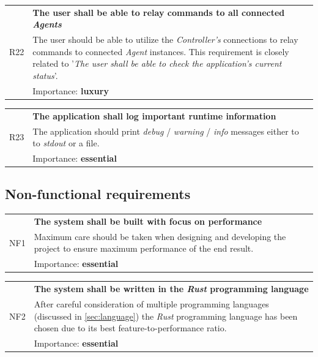 \documentclass[12pt,a4paper,table]{article}
\begin{document}
                \vspace{0.5cm}
                \noindent
                \begin{tabular}{ p{0.7cm}|p{14.5cm} }
                    \multirow{3}{*}{R22} & \textbf{The user shall be able to relay commands to all connected \textit{Agents}}\\
                    \cline{2-2}
                    & The user should be able to utilize the \textit{Controller's} connections to relay commands to connected \textit{Agent} instances. This requirement is closely related to '\textit{The user shall be able to check the application's current status}'.\\
                    \cline{2-2}
                    & Importance: \textbf{luxury}
                \end{tabular}

                \vspace{0.5cm}
                \noindent
                \begin{tabular}{ p{0.7cm}|p{14.5cm} }
                    \multirow{3}{*}{R23} & \textbf{The application shall log important runtime information}\\
                    \cline{2-2}
                    & The application should print \textit{debug} / \textit{warning} / \textit{info} messages either to to \textit{stdout} or a file.\\
                    \cline{2-2}
                    & Importance: \textbf{essential}
                \end{tabular}



        \subsection{Non-functional requirements}
            \begin{tabular}{ p{0.7cm}|p{14.5cm} }
                \multirow{3}{*}{NF1} & \textbf{The system shall be built with focus on performance}\\
                \cline{2-2}
                & Maximum care should be taken when designing and developing the project to ensure maximum performance of the end result.\\
                \cline{2-2}
                & Importance: \textbf{essential}
            \end{tabular}

            \vspace{0.5cm}
            \noindent
            \begin{tabular}{ p{0.7cm}|p{14.5cm} }
                \multirow{3}{*}{NF2} & \textbf{The system shall be written in the \textit{Rust} programming language}\\
                \cline{2-2}
                & After careful consideration of multiple programming languages (discussed in \autoref{sec:language}) the \textit{Rust} programming language has been chosen due to its best feature-to-performance ratio.\\
                \cline{2-2}
                & Importance: \textbf{essential}
            \end{tabular}
\end{document}
